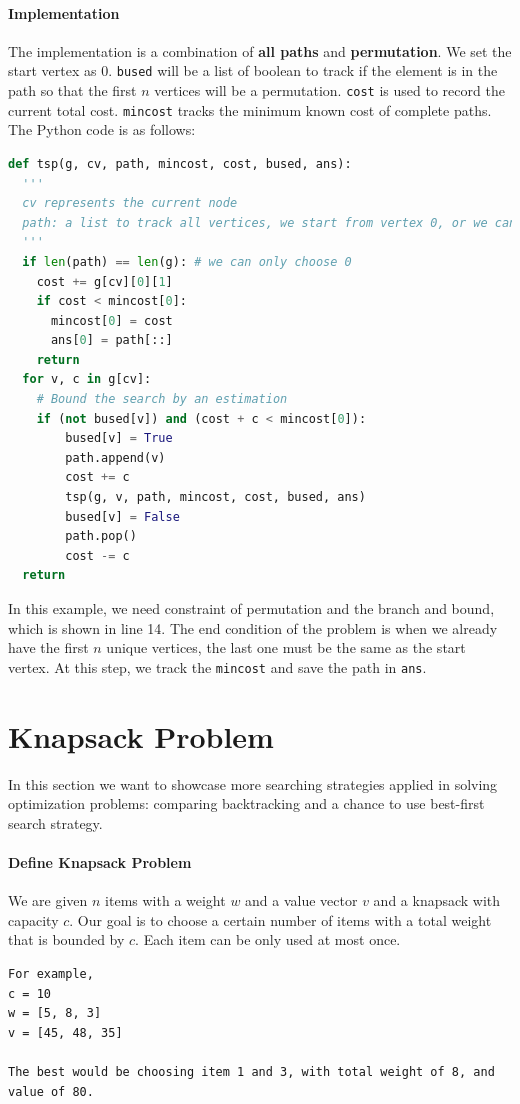 \documentclass[../main.tex]{subfiles}
\begin{document}
\paragraph{Implementation} The implementation is a combination of \textbf{all paths} and \textbf{permutation}. We set the start vertex as $0$. \texttt{bused} will be a list of boolean to track if the element is in the path so that the first $n$ vertices will be a permutation. \texttt{cost} is used to record the current total cost. \texttt{mincost} tracks the minimum known cost of complete paths. The Python code is as follows:
\begin{lstlisting}[language=Python]
def tsp(g, cv, path, mincost, cost, bused, ans):
  '''
  cv represents the current node
  path: a list to track all vertices, we start from vertex 0, or we can use ordered set.
  '''
  if len(path) == len(g): # we can only choose 0
    cost += g[cv][0][1]
    if cost < mincost[0]:
      mincost[0] = cost
      ans[0] = path[::]
    return
  for v, c in g[cv]:
    # Bound the search by an estimation    
    if (not bused[v]) and (cost + c < mincost[0]):
        bused[v] = True
        path.append(v)
        cost += c
        tsp(g, v, path, mincost, cost, bused, ans)
        bused[v] = False
        path.pop()
        cost -= c
  return
\end{lstlisting}
In this example, we need constraint of permutation and the branch and bound, which is shown in line 14. The end condition of the problem is when we already have the first $n$ unique vertices, the last one must be the same as the start vertex. At this step, we track the \texttt{mincost} and save the path in \texttt{ans}. 

\section{Knapsack Problem}
In this section we want to showcase more searching strategies applied in solving optimization problems: comparing backtracking and a chance to use best-first search strategy. 

\paragraph{Define Knapsack Problem} We are given $n$ items with a weight $w$ and a value vector $v$ and a knapsack with capacity $c$. Our goal is to choose a certain number of items with a total weight that is bounded by $c$.  Each item can be only used at most once.
\begin{lstlisting}[numbers=none]
For example,
c = 10
w = [5, 8, 3]
v = [45, 48, 35]

The best would be choosing item 1 and 3, with total weight of 8, and value of 80.
\end{lstlisting}
\end{document}
